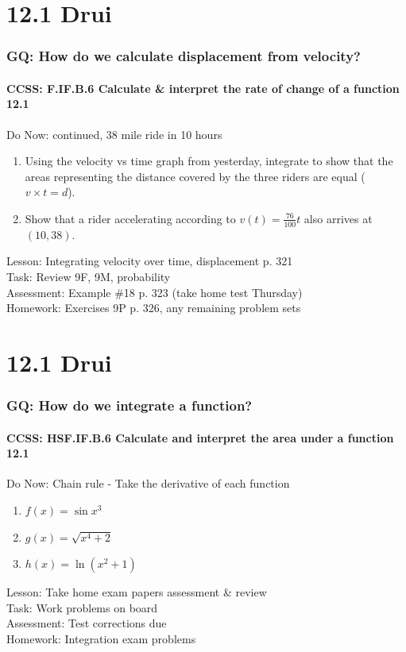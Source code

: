\documentclass{beamer}
\begin{document}
  \section{12.1 Drui}
  \frame
  {
    \frametitle{GQ: How do we calculate displacement from velocity?}
    \framesubtitle{CCSS: F.IF.B.6 Calculate \& interpret the rate of change of a function \qquad \alert{12.1}}

    \begin{block}{Do Now: continued, 38 mile ride in 10 hours}
    \begin{enumerate}
        \item Using the velocity vs time graph from yesterday, integrate to show that the areas representing the distance covered by the three riders are equal ($v \times t = d$).
        \item Show that a rider accelerating according to $v(t)= \frac{76}{100}t$ also arrives at $(10,38)$.
    \end{enumerate}
    \end{block}
    Lesson: Integrating velocity over time, displacement p. 321\\%
    Task: Review 9F, 9M, probability\\%
    Assessment: Example \#18 p. 323 (take home test Thursday)\\%
    Homework: Exercises 9P p. 326, any remaining problem sets
  }

  \section{12.1 Drui}
  \frame
  {
    \frametitle{GQ: How do we integrate a function?}
    \framesubtitle{CCSS: HSF.IF.B.6 Calculate and interpret the area under a function \qquad \alert{12.1}}

    \begin{block}{Do Now: Chain rule - Take the derivative of each function}
      \begin{enumerate}
      \item $f(x)=\sin{x^3}$
      \item $g(x)=\sqrt{x^4+2}$
      \item $h(x)=\ln{(x^2+1)}$
      \end{enumerate}
   \end{block}
    Lesson: Take home exam papers assessment \& review\\%
    Task: Work problems on board\\%
    Assessment: Test corrections due\\%
    Homework: Integration exam problems
  }
\end{document}
